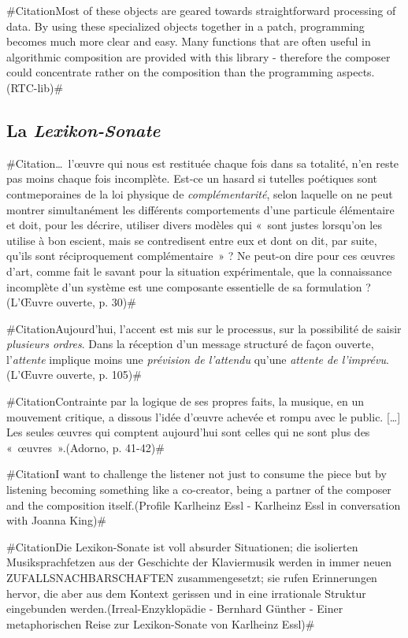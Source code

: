 \documentclass[a4paper,12pt]{article}
\newcommand{\guill}[1]{«~#1~»}
\newcommand{\zitat}[2]{\#Citation#1(#2)\#}
\begin{document}
\zitat{Most of these objects are geared towards straightforward processing of data. By using these specialized objects together in a patch, programming becomes much more clear and easy. Many functions that are often useful in algorithmic composition are provided with this library - therefore the composer could concentrate rather on the composition than the programming aspects.}
{RTC-lib}

\subsection{La \emph{Lexikon-Sonate}}

\zitat{\dots~l'œuvre qui nous est restituée chaque fois dans sa totalité, n'en reste pas moins chaque fois incomplète. Est-ce un hasard si tutelles poétiques sont contmeporaines de la loi physique de \emph{complémentarité}, selon laquelle on ne peut montrer simultanément les différents comportements d'une particule élémentaire et doit, pour les décrire, utiliser divers modèles qui \guill{sont justes lorsqu'on les utilise à bon escient, mais se contredisent entre eux et dont on dit, par suite, qu'ils sont réciproquement complémentaire} ? Ne peut-on dire pour ces œuvres d'art, comme fait le savant pour la situation expérimentale, que la connaissance incomplète d'un système est une composante essentielle de sa formulation ?}
{L'Œuvre ouverte, p. 30}

\zitat{Aujourd'hui, l'accent est mis sur le processus, sur la possibilité de saisir \emph{plusieurs ordres}. Dans la réception d'un message structuré de façon ouverte, l'\emph{attente} implique moins une \emph{prévision de l'attendu} qu'une \emph{attente de l'imprévu}.}
{L'Œuvre ouverte, p. 105}

\zitat{Contrainte par la logique de ses propres faits, la musique, en un mouvement critique, a dissous l'idée d'œuvre achevée et rompu avec le public. [\dots] Les seules œuvres qui comptent aujourd'hui sont celles qui ne sont plus des \guill{œuvres}.}
{Adorno, p. 41-42}

\zitat{I want to challenge the listener not just to consume the piece but by listening becoming something like a co-creator, being a partner of the composer and the composition itself.}
{Profile Karlheinz Essl - Karlheinz Essl in conversation with Joanna King}

\zitat{Die Lexikon-Sonate ist voll absurder Situationen; die isolierten Musiksprachfetzen aus der Geschichte der Klaviermusik werden in immer neuen ZUFALLSNACHBARSCHAFTEN zusammengesetzt; sie rufen Erinnerungen hervor, die aber aus dem Kontext gerissen und in eine irrationale Struktur eingebunden werden.}
{Irreal-Enzyklopädie - Bernhard Günther - Einer metaphorischen Reise zur Lexikon-Sonate von Karlheinz Essl}
\end{document}
